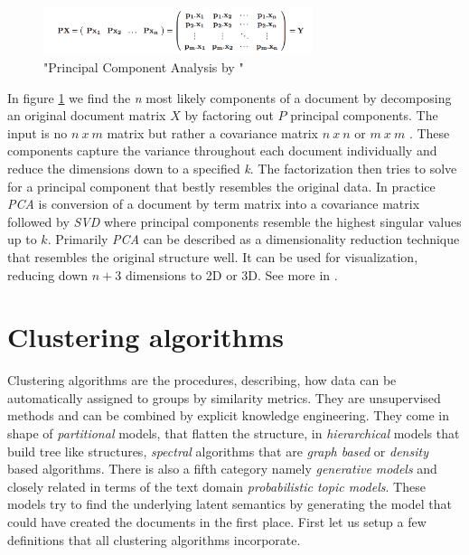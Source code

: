     \begin{figure}[h!]
      \centering
        \includegraphics[width=0.7\textwidth]{PCA.png}
        \caption{"Principal Component Analysis by \cite{PCA2009}"}
        \label{pca}
    \end{figure}

    In figure \ref{pca} we find the \emph{n} most likely components of a document by decomposing an original document matrix $X$ by factoring out $P$ principal components. The input is no $n\:x\:m$ matrix but rather a covariance matrix $n\:x\:n$ or $m\:x\:m$ . These components capture the variance throughout each document individually and reduce the dimensions down to a specified \emph{k}. The factorization then tries to solve for a principal component that bestly resembles the original data. In practice \emph{PCA} is conversion of a document by term matrix into a covariance matrix followed by \emph{SVD} where principal components resemble the highest singular values up to $k$. Primarily \emph{PCA} can be described as a dimensionality reduction technique that resembles the original structure well. It can be used for visualization, reducing down $n + 3$ dimensions to 2D or 3D. See more in \cite{PCA2009}.

\section{Clustering algorithms}
  
  Clustering algorithms are the procedures, describing, how data can be automatically assigned to groups by similarity metrics. They are unsupervised methods and can be combined by explicit knowledge engineering. They come in shape of \emph{partitional} models, that flatten the structure, in \emph{hierarchical} models that build tree like structures, \emph{spectral} algorithms that are \emph{graph based} or \emph{density} based algorithms. There is also a fifth category namely \emph{generative models} and closely related in terms of the text domain \emph{probabilistic topic models}. These models try to find the underlying latent semantics by generating the model that could have created the documents in the first place. First let us setup a few definitions that all clustering algorithms incorporate.

